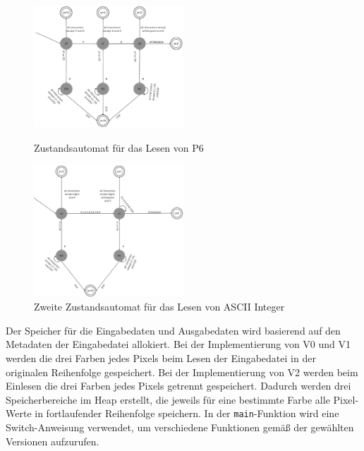 \documentclass[course=erap]{aspdoc}
\begin{document}
\begin{figure}[h]
    \centering
    \includegraphics[width=0.5\textwidth]{Bilder/auto1.png}
    \caption{Zustandsautomat für das Lesen von P6}
    \includegraphics[width=0.5\textwidth]{Bilder/auto2.png} 
    \caption{Zweite Zustandsautomat für das Lesen von ASCII Integer} 
\end{figure}
\par
Der Speicher für die Eingabedaten und Ausgabedaten wird basierend auf den Metadaten der Eingabedatei allokiert. Bei der Implementierung von V0 und V1 werden die drei Farben jedes Pixels beim Lesen der Eingabedatei in der originalen Reihenfolge gespeichert. Bei der Implementierung von V2 werden beim Einlesen die drei Farben jedes Pixels getrennt gespeichert. Dadurch werden drei Speicherbereiche im Heap erstellt, die jeweils für eine bestimmte Farbe alle Pixel-Werte in fortlaufender Reihenfolge speichern. In der \texttt{main}-Funktion wird eine Switch-Anweisung verwendet, um verschiedene Funktionen gemäß der gewählten Versionen aufzurufen.
\end{document}
